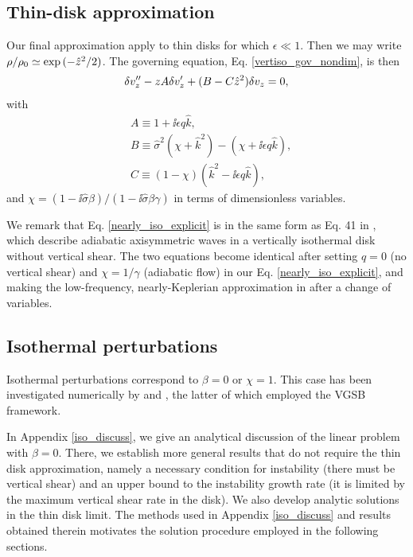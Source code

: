 \subsection{Thin-disk approximation}\label{analytic_relax}
Our final approximation apply to thin disks for 
which $\epsilon\ll 1$. Then we may write $\rho/\rho_0\simeq
\exp{(-\hat{z}^2/2)}$. The governing equation,
Eq. \ref{vertiso_gov_nondim}, is then   
\begin{align}
  \delta v_z^{\prime\prime} - z A\delta v_z^\prime +
  (B - C\hat{z}^2)\delta v_z = 0,\label{nearly_iso_explicit}
\end{align}
with
\begin{align}
  &A \equiv 1 + \ii \epsilon q \hat{k},\\
  &B \equiv \hat{\sigma}^2\left(\chi + \hat{k}^2\right) -
  \left(\chi + \ii \epsilon q \hat{k}\right),\\
  &C \equiv \left(1-\chi\right)\left(\hat{k}^2 - \ii
    \epsilon q\hat{k}\right), 
\end{align}
and $\chi =
\left(1-\ii\hat{\sigma}\beta\right)/\left(1-\ii\hat{\sigma}\beta\gamma\right)
$ in terms of dimensionless variables. 

We remark that Eq. \ref{nearly_iso_explicit} is in the same 
form as Eq. 41 in \cite{lubow93}, which describe adiabatic axisymmetric waves in
a vertically isothermal disk without vertical shear. The two equations
become identical after  setting $q=0$ (no vertical shear) and
$\chi=1/\gamma$ (adiabatic flow) in our Eq. \ref{nearly_iso_explicit},
and making the low-frequency, nearly-Keplerian approximation in
\citeauthor{lubow93} after a change of variables.    


\subsection{Isothermal perturbations}\label{iso_pert}
Isothermal perturbations correspond to $\beta = 0$ or $\chi = 1$. This
case has been investigated numerically by \cite{nelson13} and 
\cite{mcnally14}, the latter of which employed the VGSB framework.  

In Appendix \ref{iso_discuss}, we give an analytical discussion of the
linear problem with $\beta=0$. There, we establish more general
results that do not require the thin disk approximation, namely 
a necessary condition for instability (there must be vertical shear)
and an upper bound to the instability growth rate (it is limited by
the maximum vertical shear rate in the disk). We also develop analytic
solutions in the thin disk limit. The methods used in Appendix
\ref{iso_discuss} and results obtained therein motivates the solution
procedure employed in the following sections.      

